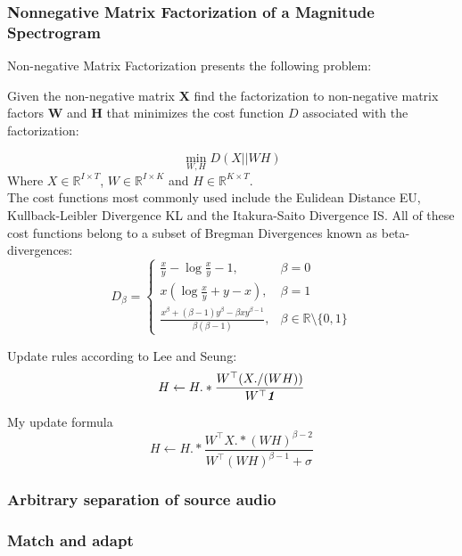 \documentclass[10pt]{article}
\def\mathbi#1{\textbf{\em #1}}
\begin{document}
\subsubsection{Nonnegative Matrix Factorization of a Magnitude Spectrogram}
Non-negative Matrix Factorization presents the following problem:
\begin{center}
Given the non-negative matrix \textbf{X} find the factorization to non-negative matrix factors  \textbf{W} and \textbf{H} that minimizes the cost function $D$ associated with the factorization:
\end{center}
\begin{equation}
{\min_{W,H} D(X||WH)}
\end{equation}
Where $X\in \mathbb{R}^{I \times T}$, $W\in \mathbb{R}^{I \times K}$ and $H\in \mathbb{R}^{K \times T}$. 
\\
The cost functions most commonly used include the Eulidean Distance EU, Kullback-Leibler Divergence KL and the Itakura-Saito Divergence IS. All of these cost functions belong to a subset of Bregman Divergences known as beta-divergences:
\begin{equation}
D_\beta =     \left\{ \begin{array}{rcl}\frac{x}{y}-\log \frac{x}{y}-1, & \beta = 0 \\ 
x(\log \frac{x}{y}+y-x),  & \beta = 1
\\
\iffalse 
(x-y)^2, & \beta = 2
\\
\fi
\frac{x^\beta +(\beta -1)y^\beta -\beta xy^{\beta-1}}{\beta (\beta -1)}, & \beta \in \mathbb{R}\setminus \lbrace0,1\rbrace \end{array}\right.
\end{equation}


Update rules according to Lee and Seung:
\begin{equation}
H \leftarrow H.*\frac{W^\top (X./(WH))}{W^\top\mathbi{1}}
\end{equation}

My update formula
\begin{equation}
H \leftarrow H.*\frac{W^\top X.*(WH)^{\beta-2}}{W^\top (WH)^{\beta-1} +\sigma}
\end{equation}
\subsubsection{Arbitrary separation of source audio}

\subsubsection{Match and adapt }
\end{document}
